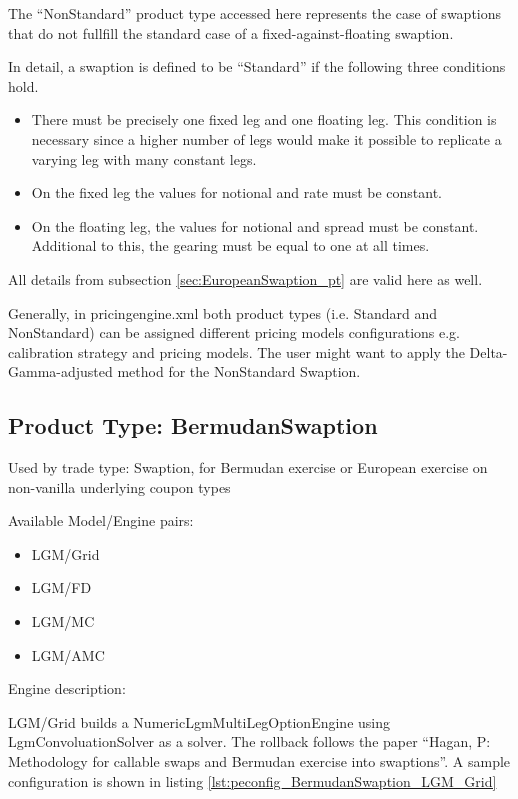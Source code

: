 The ``NonStandard'' product type accessed here represents the case of swaptions that do not fullfill
the standard case of a fixed-against-floating swaption. 

In detail, a swaption is defined to be ``Standard'' if the following three conditions hold.

\begin{itemize}
    \item There must be precisely one fixed leg and one floating leg. This condition is necessary since a higher number of legs would
        make it possible to replicate a varying leg with many constant legs.
    \item On the fixed leg the values for notional and rate must be constant.
    \item On the floating leg, the values for notional and spread must be constant. 
    Additional to this, the gearing must be equal to one at all times.
\end{itemize}

All details from subsection \ref{sec:EuropeanSwaption_pt} are valid here as well.

Generally, in pricingengine.xml both product types (i.e. Standard and NonStandard) can be assigned different pricing models configurations e.g.
calibration strategy and pricing models. The user might want to apply the Delta-Gamma-adjusted method for the NonStandard Swaption.

\subsection{Product Type: BermudanSwaption}

\label{sec:BermudanSwaption_pt}
Used by trade type: Swaption, for Bermudan exercise or European exercise on non-vanilla underlying coupon types

Available Model/Engine pairs:

\begin{itemize}
\item LGM/Grid
\item LGM/FD
\item LGM/MC
\item LGM/AMC
\end{itemize}

Engine description:

LGM/Grid builds a NumericLgmMultiLegOptionEngine using LgmConvoluationSolver as a solver. The rollback follows the paper
``Hagan, P: Methodology for callable swaps and Bermudan exercise into swaptions''. A sample configuration is shown in
listing \ref{lst:peconfig_BermudanSwaption_LGM_Grid}

